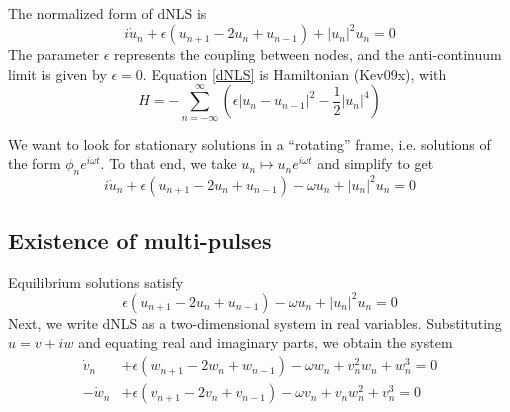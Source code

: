 \documentclass[12pt]{article}
\begin{document}
The normalized form of dNLS is
\begin{equation}\label{dNLS}
i\dot{u}_n + \epsilon(u_{n+1} - 2 u_n + u_{n-1}) + |u_n|^2 u_n = 0
\end{equation}
The parameter $\epsilon$ represents the coupling between nodes, and the anti-continuum limit is given by $\epsilon = 0$. Equation \eqref{dNLS} is Hamiltonian (Kev09x), with
\[
H = -\sum_{n=-\infty}^\infty\left( \epsilon|u_n - u_{n-1}|^2
-\frac{1}{2}|u_n|^4 \right)
\]

We want to look for stationary solutions in a ``rotating'' frame, i.e. solutions of the form $\phi_n e^{i \omega t}$. To that end, we take $u_n \mapsto u_n e^{i \omega t}$ and simplify to get
\begin{equation}\label{dNLSrot}
i\dot{u}_n + \epsilon(u_{n+1} - 2 u_n + u_{n-1}) - \omega u_n + |u_n|^2 u_n = 0
\end{equation}

\subsection{Existence of multi-pulses}

Equilibrium solutions satisfy
\begin{equation}\label{dNLSequilib}
\epsilon(u_{n+1} - 2 u_n + u_{n-1}) - \omega u_n + |u_n|^2 u_n = 0
\end{equation}
Next, we write dNLS as a two-dimensional system in real variables. Substituting $u = v + i w$ and equating real and imaginary parts, we obtain the system 
\begin{equation}\label{dNLSreal}
\begin{aligned}
\dot{v}_n  &+ \epsilon (w_{n+1} - 2 w_n + w_{n-1}) - \omega w_n + v_n^2 w_n + w_n^3 = 0 \\
-\dot{w}_n &+ \epsilon (v_{n+1} - 2 v_n + v_{n-1}) - \omega v_n + v_n w_n^2 + v_n^3 = 0
\end{aligned}
\end{equation}
\end{document}
